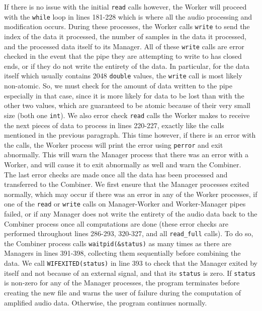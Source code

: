 \documentclass[11pt]{extarticle}
\begin{document}
If there is no issue with the initial \texttt{read} calls however, the Worker will proceed with the \texttt{while} loop in lines 181-228 which is where all the audio processing and modification occurs. During these processes, the Worker calls \texttt{write} to send the index of the data it processed, the number of samples in the data it processed, and the processed data itself to its Manager. All of these \texttt{write} calls are error checked in the event that the pipe they are attempting to write to has closed ends, or if they do not write the entirety of the data. In particular, for the data itself which usually contains 2048 \texttt{double} values, the \texttt{write} call is most likely non-atomic. So, we must check for the amount of data written to the pipe especially in that case, since it is more likely for data to be lost than with the other two values, which are guaranteed to be atomic because of their very small size (both one \texttt{int}). We also error check \texttt{read} calls the Worker makes to receive the next pieces of data to process in lines 220-227, exactly like the calls mentioned in the previous paragraph. This time however, if there is an error with the calls, the Worker process will print the error using \texttt{perror} and exit abnormally. This will warn the Manager process that there was an error with a Worker, and will cause it to exit abnormally as well and warn the Combiner. \\

The last error checks are made once all the data has been processed and transferred to the Combiner. We first ensure that the Manager processes exited normally, which may occur if there was an error in any of the Worker processes, if one of the \texttt{read} or \texttt{write} calls on Manager-Worker and Worker-Manager pipes failed, or if any Manager does not write the entirety of the audio data back to the Combiner process once all computations are done (these error checks are performed throughout lines 286-293, 320-327, and all \texttt{read\_full} calls). To do so, the Combiner process calls \texttt{waitpid(\&status)} as many times as there are Managers in lines 391-398, collecting them sequentially before combining the data. We call \texttt{WIFEXITED(status)} in line 393 to check that the Manager exited by itself and not because of an external signal, and that its \texttt{status} is zero. If \texttt{status} is non-zero for any of the Manager processes, the program terminates before creating the new file and warns the user of failure during the computation of amplified audio data. Otherwise, the program continues normally.
\end{document}
